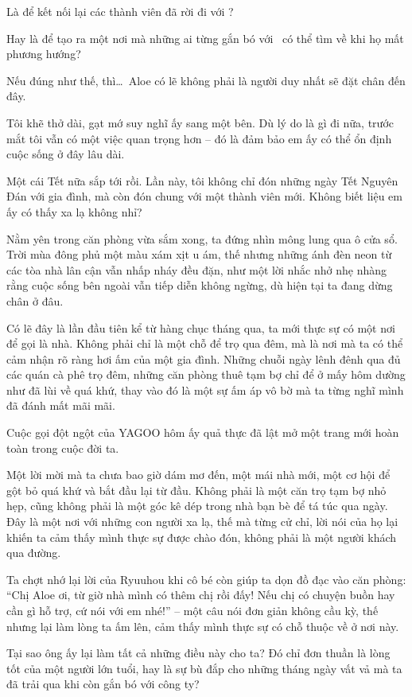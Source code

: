 \documentclass[../main.tex]{subfiles}
\begin{document}
Là để kết nối lại các thành viên đã rời đi với \hll?

Hay là để tạo ra một nơi mà những ai từng gắn bó với \hll\ có thể tìm về khi họ mất phương hướng?

Nếu đúng như thế, thì\dots\ Aloe có lẽ không phải là người duy nhất sẽ đặt chân đến đây.

Tôi khẽ thở dài, gạt mớ suy nghĩ ấy sang một bên. Dù lý do là gì đi nữa, trước mắt tôi vẫn có một việc quan trọng hơn – đó là đảm bảo em ấy có thể ổn định cuộc sống ở đây lâu dài.

Một cái Tết nữa sắp tới rồi. Lần này, tôi không chỉ đón những ngày Tết Nguyên Đán với gia đình, mà còn đón chung với một thành viên mới. Không biết liệu em ấy có thấy xa lạ không nhỉ?


Nằm yên trong căn phòng vừa sắm xong, ta đứng nhìn mông lung qua ô cửa sổ. Trời mùa đông phủ một màu xám xịt u ám, thế nhưng những ánh đèn neon từ các tòa nhà lân cận vẫn nhấp nháy đều đặn, như một lời nhắc nhở nhẹ nhàng rằng cuộc sống bên ngoài vẫn tiếp diễn không ngừng, dù hiện tại ta đang dừng chân ở đâu.

Có lẽ đây là lần đầu tiên kể từ hàng chục tháng qua, ta mới thực sự có một nơi để gọi là nhà. Không phải chỉ là một chỗ để trọ qua đêm, mà là nơi mà ta có thể cảm nhận rõ ràng hơi ấm của một gia đình. Những chuỗi ngày lênh đênh qua đủ các quán cà phê trọ đêm, những căn phòng thuê tạm bợ chỉ để ở mấy hôm dường như đã lùi về quá khứ, thay vào đó là một sự ấm áp vô bờ mà ta từng nghĩ mình đã đánh mất mãi mãi.

Cuộc gọi đột ngột của YAGOO hôm ấy quả thực đã lật mở một trang mới hoàn toàn trong cuộc đời ta.

Một lời mời mà ta chưa bao giờ dám mơ đến, một mái nhà mới, một cơ hội để gột bỏ quá khứ và bắt đầu lại từ đầu. Không phải là một căn trọ tạm bợ nhỏ hẹp, cũng không phải là một góc kê dép trong nhà bạn bè để tá túc qua ngày. Đây là một nơi với những con người xa lạ, thế mà từng cử chỉ, lời nói của họ lại khiến ta cảm thấy mình thực sự được chào đón, không phải là một người khách qua đường.

Ta chợt nhớ lại lời của Ryuuhou khi cô bé còn giúp ta dọn đồ đạc vào căn phòng: ``Chị Aloe ơi, từ giờ nhà mình có thêm chị rồi đấy! Nếu chị có chuyện buồn hay cần gì hỗ trợ, cứ nói với em nhé!'' – một câu nói đơn giản không cầu kỳ, thế nhưng lại làm lòng ta ấm lên, cảm thấy mình thực sự có chỗ thuộc về ở nơi này.

Tại sao ông ấy lại làm tất cả những điều này cho ta? Đó chỉ đơn thuần là lòng tốt của một người lớn tuổi, hay là sự bù đắp cho những tháng ngày vất vả mà ta đã trải qua khi còn gắn bó với công ty?
\end{document}
